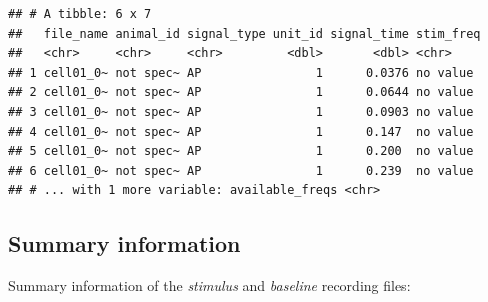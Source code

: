 \documentclass[12pt,]{article}
\newenvironment{Shaded}{\begin{snugshade}}{\end{snugshade}}
\newcommand{\DataTypeTok}[1]{\textcolor[rgb]{0.13,0.29,0.53}{#1}}
\newcommand{\KeywordTok}[1]{\textcolor[rgb]{0.13,0.29,0.53}{\textbf{#1}}}
\newcommand{\NormalTok}[1]{#1}
\newcommand{\OperatorTok}[1]{\textcolor[rgb]{0.81,0.36,0.00}{\textbf{#1}}}
\newcommand{\StringTok}[1]{\textcolor[rgb]{0.31,0.60,0.02}{#1}}
\begin{document}
\begin{Shaded}
\end{Shaded}

\begin{verbatim}
## # A tibble: 6 x 7
##   file_name animal_id signal_type unit_id signal_time stim_freq
##   <chr>     <chr>     <chr>         <dbl>       <dbl> <chr>    
## 1 cell01_0~ not spec~ AP                1      0.0376 no value 
## 2 cell01_0~ not spec~ AP                1      0.0644 no value 
## 3 cell01_0~ not spec~ AP                1      0.0903 no value 
## 4 cell01_0~ not spec~ AP                1      0.147  no value 
## 5 cell01_0~ not spec~ AP                1      0.200  no value 
## 6 cell01_0~ not spec~ AP                1      0.239  no value 
## # ... with 1 more variable: available_freqs <chr>
\end{verbatim}

\hypertarget{summary-information}{%
\subsection{Summary information}\label{summary-information}}

Summary information of the \emph{stimulus} and \emph{baseline} recording
files:
\end{document}

